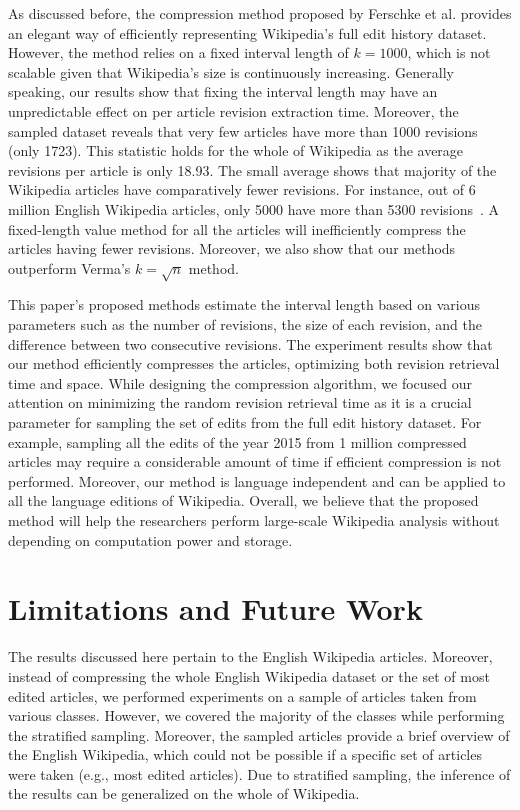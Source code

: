 \documentclass[acmsmall]{acmart}
\begin{document}
As discussed before, the compression method proposed by Ferschke et al. provides an elegant way of efficiently representing Wikipedia's full edit history dataset. However, the method relies on a fixed interval length of $k = 1000$, which is not scalable given that Wikipedia's size is continuously increasing. Generally speaking, our results show that fixing the interval length may have an unpredictable effect on per article revision extraction time. Moreover, the sampled dataset reveals that very few articles have more than 1000 revisions (only 1723). This statistic holds for the whole of Wikipedia as the average revisions per article is only 18.93. The small average shows that majority of the Wikipedia articles have comparatively fewer revisions. For instance, out of 6 million English Wikipedia articles, only 5000 have more than 5300 revisions~\cite{wiki_most}. A fixed-length value method for all the articles will inefficiently compress the articles having fewer revisions.  Moreover, we also show that our methods outperform Verma's $k = \sqrt{n}$ method.
 
This paper's proposed methods estimate the interval length based on various parameters such as the number of revisions, the size of each revision, and the difference between two consecutive revisions. The experiment results show that our method efficiently compresses the articles, optimizing both revision retrieval time and space. While designing the compression algorithm, we focused our attention on minimizing the random revision retrieval time as it is a crucial parameter for sampling the set of edits from the full edit history dataset. For example, sampling all the edits of the year 2015 from 1 million compressed articles may require a considerable amount of time if efficient compression is not performed. Moreover, our method is language independent and can be applied to all the language editions of Wikipedia. Overall, we believe that the proposed method will help the researchers perform large-scale Wikipedia analysis without depending on computation power and storage.


\section{Limitations and Future Work}
The results discussed here pertain to the English Wikipedia articles. Moreover, instead of compressing the whole English Wikipedia dataset or the set of most edited articles, we performed experiments on a sample of articles taken from various classes. However, we covered the majority of the classes while performing the stratified sampling. Moreover, the sampled articles provide a brief overview of the English Wikipedia, which could not be possible if a specific set of articles were taken (e.g., most edited articles). Due to stratified sampling, the inference of the results can be generalized on the whole of Wikipedia. 
\end{document}
